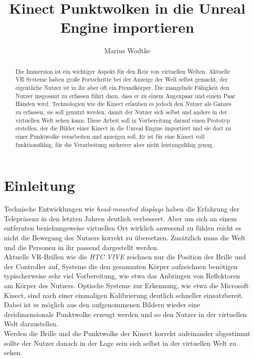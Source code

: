 \documentclass[a4paper]{IEEEtran}
\title{Kinect Punktwolken in die Unreal Engine importieren}
\author{Marius Wodtke}
\begin{document}
\maketitle

\begin{abstract}
	Die Immersion ist ein wichtiger Aspekt für den Reiz von virtuellen Welten. 
	Aktuelle VR Systeme haben große Fortschritte bei der Anzeige der Welt selbst gemacht, der eigentliche Nutzer ist in ihr aber oft ein Fremdkörper.
	Die mangelnde Fähigkeit den Nutzer insgesamt zu erfassen führt dazu, dass er zu einem Augenpaar und einem Paar Händen wird. 
	Technologien wie die Kinect erlauben es jedoch den Nutzer als Ganzes zu erfassen, sie soll genutzt werden, damit der Nutzer sich selbst und andere in der virtuellen Welt sehen kann.
	Diese Arbeit soll in Vorbereitung darauf einen Prototyp erstellen, der die Bilder einer Kinect in die Unreal Engine importiert und sie dort zu einer Punktwolke verarbeiten und anzeigen soll.
	Er ist für eine Kinect voll funktionsfähig, für die Verarbeitung mehrerer aber nicht leistungsfähig genug.
\end{abstract}

\section{Einleitung}
	Technische Entwicklungen wie {\textit{head-mounted displays}} haben die Erfahrung der Telepräsenz in den letzten Jahren deutlich verbessert. 
	Aber um sich an einem entfernten beziehungsweise virtuellen Ort wirklich anwesend zu fühlen reicht es nicht die Bewegung des Nutzers korrekt zu übersetzen. 
	Zusätzlich muss die Welt und die Personen in ihr passend dargestellt werden. \\
	Aktuelle VR-Brillen wie die \textit{HTC VIVE} zeichnen nur die Position der Brille und der Controller auf, Systeme die den gesammten Körper aufzeichnen benötigen typischerweise sehr viel Vorbereitung, wie etwa das Anbringen von Reflektoren am Körper des Nutzers. 
	Optische Systeme zur Erkennung, wie etwa die Microsoft Kinect, sind nach einer einmaligen Kalibrierung deutlich schneller einsatzbereit. 
	Dabei ist es möglich aus den aufgenommenen Bildern wieder eine dreidimensionale Punktwolke erzeugt werden und so den Nutzer in der virtuellen Welt darzustellen. \\
	Werden die Brille und die Punktwolke der Kinect korrekt aufeinander abgestimmt sollte der Nutzer danach in der Lage sein sich selbst in der virtuellen Welt zu sehen.\\
\end{document}
